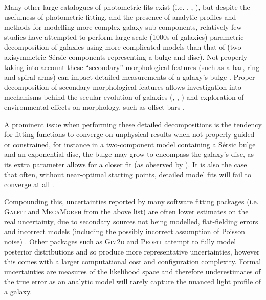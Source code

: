 \documentclass[main\.tex]{subfiles}
\begin{document}
Many other large catalogues of photometric fits exist (i.e. \citealt{2012MNRAS.421.2277L}, \citealt{2012MNRAS.421.1007K}, \citealt{2012ApJS..203...24V}), but despite the usefulness of photometric fitting, and the presence of analytic profiles and methods for modelling more complex galaxy sub-components, relatively few studies have attempted to perform large-scale (1000s of galaxies) parametric decomposition of galaxies using more complicated models than that of \citet{2011ApJS..196...11S} (two axisymmetric S\'ersic components representing a bulge and disc). Not properly taking into account these ``secondary'' morphological features (such as a bar, ring and spiral arms) can impact detailed measurements of a galaxy's bulge \citep{Gao2017:1709.00746v1}. Proper decomposition of secondary morphological features allows investigation into mechanisms behind the secular evolution of galaxies (\citealt{2015MNRAS.453.3729H}, \citealt{2018MNRAS.473.4731K}, \citealt{2018ApJ...862..100G}) and exploration of environmental effects on morphology, such as offset bars \citep{2017MNRAS.469.3363K}.

A prominent issue when performing these detailed decompositions is the tendency for fitting functions to converge on unphysical results when not properly guided or constrained, for instance in a two-component model containing a S\'ersic bulge and an exponential disc, the bulge may grow to encompass the galaxy's disc, as its extra parameter allows for a closer fit (as observed by \citealt{2018MNRAS.473.4731K}). It is also the case that often, without near-optimal starting points, detailed model fits will fail to converge at all \citep{2016MNRAS.462.1470L}.

Compounding this, uncertainties reported by many software fitting packages (i.e. \textsc{Galfit} and \textsc{MegaMorph} from the above list) are often lower estimates on the real uncertainty, due to secondary sources not being modelled, flat-fielding errors and incorrect models (including the possibly incorrect assumption of Poisson noise) \citep{2010AJ....139.2097P}. Other packages such as \textsc{Gim2d} and \textsc{Profit} attempt to fully model posterior distributions and so produce more representative uncertainties, however this comes with a larger computational cost and configuration complexity. Formal uncertainties are measures of the likelihood space and therefore underestimates of the true error as an analytic model will rarely capture the nuanced light profile of a galaxy.
\end{document}
